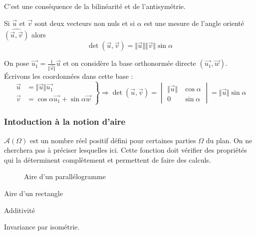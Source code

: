\begin{demo}
 C'est une conséquence de la bilinéarité et de l'antisymétrie.
\end{demo}
\begin{prop}
 Si $\overrightarrow u$ et $\overrightarrow v$ sont deux vecteurs non nuls et si $\alpha$ est une mesure de l'angle orienté $\widehat{(\overrightarrow{u},\overrightarrow{v})}$ alors
\begin{displaymath}
 \det(\overrightarrow{u},\overrightarrow{v}) = \Vert\overrightarrow{u}\Vert \Vert\overrightarrow{v}\Vert \sin \alpha
\end{displaymath}
\end{prop}
\begin{demo}
 On pose $\overrightarrow{u_1} = \frac{1}{\Vert \overrightarrow u \Vert}\overrightarrow u$ et on considère la base orthonormée directe $(\overrightarrow {u_1}, \overrightarrow{w})$. \'Ecrivons les coordonnées dans cette base :
\begin{displaymath}
\left. 
\begin{aligned}
 \overrightarrow u &= \Vert \overrightarrow u \Vert \overrightarrow{u_1} \\
 \overrightarrow v &= \cos \alpha \overrightarrow{u_1} + \sin \alpha \overrightarrow{w}
\end{aligned}
\right\rbrace \Rightarrow
\det (\overrightarrow{u},\overrightarrow{v}) =
\begin{vmatrix}
 \Vert \overrightarrow u \Vert & \cos \alpha \\
 0 & \sin\alpha
\end{vmatrix}
= \Vert \overrightarrow u \Vert \sin \alpha
\end{displaymath}

\end{demo}

\subsubsection*{Intoduction à la notion d'aire}
$\mathcal A (\Omega)$ est un nombre réel positif défini pour certaines parties $\Omega$ du plan. On ne cherchera pas à préciser lesquelles ici. Cette fonction doit vérifier des propriétés qui la déterminent complètement et permettent de faire des calculs.
\begin{figure}[ht]
 \centering

\caption{Aire d'un parallélogramme}
\label{fig:C2005_2}
\end{figure}

\begin{description}
 \item Aire d'un rectangle
\item Additivité
\item Invariance par isométrie.
\end{description}

